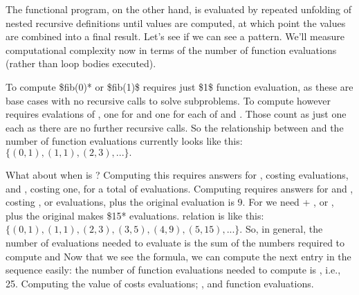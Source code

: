 \documentclass[letterpaper,10pt,english]{sphinxmanual}
\begin{document}
The functional program, on the other hand, is evaluated by repeated
unfolding of nested recursive definitions until values are computed,
at which point the values are combined into a final result. Let’s see
if we can see a pattern. We’ll measure computational complexity now in
terms of the number of function evaluations (rather than loop bodies
executed).

To compute \$fib(0)* or \$fib(1)\$ requires just \$1\$ function evaluation,
as these are base cases with no recursive calls to solve subproblems.
To compute  however requires  evalations of , one for
 and one for each of  and . Those count as just one each as
there are no further recursive calls. So the relationship between 
and the number of function evaluations currently looks like this:
\(\{ (0,1), (1,1), (2,3), ... \}.\)

What about when  is ?  Computing this requires answers for
, costing  evaluations, and , costing one, for a
total of  evaluations. Computing  requires answers for
 and , costing , or  evaluations, plus the
original evaluation is 9. For  we need  + , or ,
plus the original makes \$15* evaluations.  relation is like this:
\(\{ (0,1), (1,1), (2,3), (3,5), (4,9), (5, 15), ... \}.\) So, in
general, the number of evaluations needed to evaluate  is
the sum of the numbers required to compute  and  Now that we see the formula, we can compute the next entry in the
sequence easily: the number of function evaluations needed to compute
 is , i.e., 25. Computing the value of 
costs  evaluations; , 
and  function evaluations.
\end{document}
